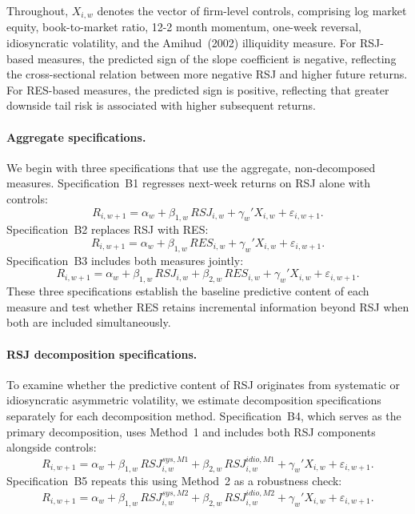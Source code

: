 \documentclass[11pt,a4paper]{article}
\begin{document}
Throughout, $X_{i,w}$ denotes the vector of firm-level controls,
comprising log market equity, book-to-market ratio, 12-2 month
momentum, one-week reversal, idiosyncratic volatility, and the
Amihud~(2002) illiquidity measure. For RSJ-based measures, the
predicted sign of the slope coefficient is negative, reflecting the
cross-sectional relation between more negative RSJ and higher future
returns. For RES-based measures, the predicted sign is positive,
reflecting that greater downside tail risk is associated with higher
subsequent returns.

\paragraph{Aggregate specifications.}
We begin with three specifications that use the aggregate, non-decomposed
measures. Specification~B1 regresses next-week returns on RSJ alone
with controls:
\begin{equation}
R_{i,w+1} = \alpha_w + \beta_{1,w}\,RSJ_{i,w} + \gamma_w' X_{i,w}
+ \varepsilon_{i,w+1}.
\label{eq:B1}
\end{equation}
Specification~B2 replaces RSJ with RES:
\begin{equation}
R_{i,w+1} = \alpha_w + \beta_{1,w}\,RES_{i,w} + \gamma_w' X_{i,w}
+ \varepsilon_{i,w+1}.
\label{eq:B2}
\end{equation}
Specification~B3 includes both measures jointly:
\begin{equation}
R_{i,w+1} = \alpha_w + \beta_{1,w}\,RSJ_{i,w} + \beta_{2,w}\,RES_{i,w}
+ \gamma_w' X_{i,w} + \varepsilon_{i,w+1}.
\label{eq:B3}
\end{equation}
These three specifications establish the baseline predictive content of
each measure and test whether RES retains incremental information beyond
RSJ when both are included simultaneously.

\paragraph{RSJ decomposition specifications.}
To examine whether the predictive content of RSJ originates from
systematic or idiosyncratic asymmetric volatility, we estimate
decomposition specifications separately for each decomposition method.
Specification~B4, which serves as the primary decomposition, uses
Method~1 and includes both RSJ components alongside controls:
\begin{equation}
R_{i,w+1} = \alpha_w + \beta_{1,w}\,RSJ^{sys,M1}_{i,w}
+ \beta_{2,w}\,RSJ^{idio,M1}_{i,w}
+ \gamma_w' X_{i,w} + \varepsilon_{i,w+1}.
\label{eq:B4}
\end{equation}
Specification~B5 repeats this using Method~2 as a robustness check:
\begin{equation}
R_{i,w+1} = \alpha_w + \beta_{1,w}\,RSJ^{sys,M2}_{i,w}
+ \beta_{2,w}\,RSJ^{idio,M2}_{i,w}
+ \gamma_w' X_{i,w} + \varepsilon_{i,w+1}.
\label{eq:B5}
\end{equation}
\end{document}
